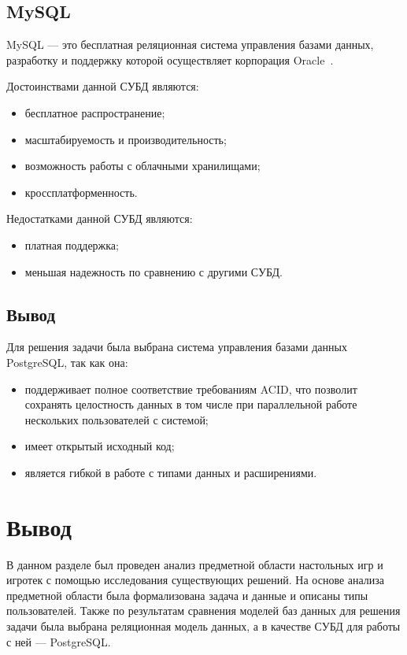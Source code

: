 \subsection{MySQL}

MySQL --- это бесплатная реляционная система управления базами данных,
разработку и поддержку которой осуществляет корпорация Oracle~\cite{art06}.

Достоинствами данной СУБД являются:
\begin{itemize}
    \item бесплатное распространение;
    \item масштабируемость и производительность;
    \item возможность работы с облачными хранилищами;
    \item кроссплатформенность.
\end{itemize}

Недостатками данной СУБД являются:
\begin{itemize}
    \item платная поддержка;
    \item меньшая надежность по сравнению с другими СУБД.
\end{itemize}

\subsection*{Вывод}

Для решения задачи была выбрана система управления базами данных
PostgreSQL, так как она:

\begin{itemize}
    \item поддерживает полное соответствие требованиям ACID, что
позволит сохранять целостность данных в том числе при параллельной работе
нескольких пользователей с системой;
    \item имеет открытый исходный код;
    \item является гибкой в работе с типами данных и расширениями.
\end{itemize}

\section*{Вывод}

В данном разделе был проведен анализ предметной области настольных игр и игротек
с помощью исследования существующих решений. На основе анализа предметной
области была формализована задача и данные и описаны типы пользователей. Также
по результатам сравнения моделей баз данных для решения задачи была выбрана
реляционная модель данных, а в качестве СУБД для работы с ней --- PostgreSQL.
